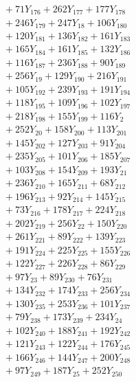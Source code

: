 \documentclass[a4paper,10pt]{article}
\begin{document}
{\begin{align}
&\quad  + 71Y_{176} + 262Y_{177} + 177Y_{178} \\[0.5ex]
&\quad  + 246Y_{179} + 247Y_{18} + 106Y_{180} \\[0.5ex]
&\quad  + 120Y_{181} + 136Y_{182} + 161Y_{183} \\[0.5ex]
&\quad  + 165Y_{184} + 161Y_{185} + 132Y_{186} \\[0.5ex]
&\quad  + 116Y_{187} + 236Y_{188} + 90Y_{189} \\[0.5ex]
&\quad  + 256Y_{19} + 129Y_{190} + 216Y_{191} \\[0.5ex]
&\quad  + 105Y_{192} + 239Y_{193} + 191Y_{194} \\[0.5ex]
&\quad  + 118Y_{195} + 109Y_{196} + 102Y_{197} \\[0.5ex]
&\quad  + 218Y_{198} + 155Y_{199} + 116Y_{2} \\[0.5ex]
&\quad  + 252Y_{20} + 158Y_{200} + 113Y_{201} \\[0.5ex]
&\quad  + 145Y_{202} + 127Y_{203} + 91Y_{204} \\[0.5ex]
&\quad  + 235Y_{205} + 101Y_{206} + 185Y_{207} \\[0.5ex]
&\quad  + 103Y_{208} + 154Y_{209} + 193Y_{21} \\[0.5ex]
&\quad  + 236Y_{210} + 165Y_{211} + 68Y_{212} \\[0.5ex]
&\quad  + 196Y_{213} + 92Y_{214} + 145Y_{215} \\[0.5ex]
&\quad  + 73Y_{216} + 178Y_{217} + 224Y_{218} \\[0.5ex]
&\quad  + 202Y_{219} + 256Y_{22} + 150Y_{220} \\[0.5ex]
&\quad  + 261Y_{221} + 89Y_{222} + 139Y_{223} \\[0.5ex]
&\quad  + 191Y_{224} + 225Y_{225} + 155Y_{226} \\[0.5ex]
&\quad  + 122Y_{227} + 226Y_{228} + 86Y_{229} \\[0.5ex]
&\quad  + 97Y_{23} + 89Y_{230} + 76Y_{231} \\[0.5ex]
&\quad  + 134Y_{232} + 174Y_{233} + 256Y_{234} \\[0.5ex]
&\quad  + 130Y_{235} + 253Y_{236} + 101Y_{237} \\[0.5ex]
&\quad  + 79Y_{238} + 173Y_{239} + 234Y_{24} \\[0.5ex]
&\quad  + 102Y_{240} + 188Y_{241} + 192Y_{242} \\[0.5ex]
&\quad  + 121Y_{243} + 122Y_{244} + 176Y_{245} \\[0.5ex]
&\quad  + 166Y_{246} + 144Y_{247} + 200Y_{248} \\[0.5ex]
&\quad  + 97Y_{249} + 187Y_{25} + 252Y_{250} \\[0.5ex]

\end{align}}
\end{document}
